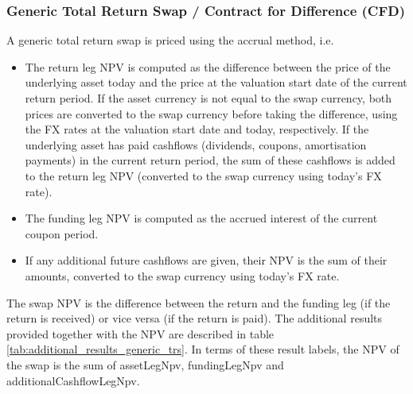\subsubsection{Generic Total Return Swap / Contract for Difference (CFD)}

A generic total return swap is priced using the accrual method, i.e.

\begin{itemize}
\item The return leg NPV is computed as the difference between the price of the underlying asset today and the price at
  the valuation start date of the current return period. If the asset currency is not equal to the swap currency, both
  prices are converted to the swap currency before taking the difference, using the FX rates at the valuation start date
  and today, respectively. If the underlying asset has paid cashflows (dividends, coupons, amortisation payments) in the
  current return period, the sum of these cashflows is added to the return leg NPV (converted to the swap currency using
  today's FX rate).
\item The funding leg NPV is computed as the accrued interest of the current coupon period.
\item If any additional future cashflows are given, their NPV is the sum of their amounts, converted to the swap
  currency using today's FX rate.
\end{itemize}

The swap NPV is the difference between the return and the funding leg (if the return is received) or vice versa (if the
return is paid). The additional results provided together with the NPV are described in table
\ref{tab:additional_results_generic_trs}. In terms of these result labels, the NPV of the swap is the sum of
assetLegNpv, fundingLegNpv and additionalCashflowLegNpv.

